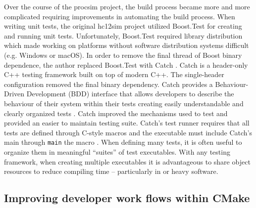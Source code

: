 Over the course of the procsim project, the build process became more and more complicated requiring improvements in automating the build process. When writing unit tests, the original hc12sim project utilized Boost.Test \cite{Boost1.53.0:Test} for creating and running unit tests. Unfortunately, Boost.Test required library distribution which made working on platforms without software distribution systems difficult (e.g. Windows or macOS). In order to remove the final thread of Boost binary dependence, the author replaced Boost.Test with Catch \cite{CatchLib}. Catch is a header-only C++ testing framework built on top of modern C++. The single-header configuration removed the final binary dependency. Catch provides a Behaviour-Driven Development (BDD) interface that allows developers to describe the behaviour of their system within their tests creating easily understandable and clearly organized tests \cite{Solis2011}. Catch improved the mechanisms used to test and provided an easier to maintain testing suite. Catch's test runner requires that all tests are defined through C-style macros and the executable must include Catch's main through \verb|main| the  macro \cite{CatchLib:Tutorial}. When defining many tests, it is often useful to organize them in meaningful ``suites'' of test executables. With any testing framework, when creating multiple executables it is advantageous to share object resources to reduce compiling time -- particularly in  or  heavy software.

\subsection{Improving developer work flows within CMake}
\label{sec:lua:sec:cross-platform-development:sec:cmake-flows}

